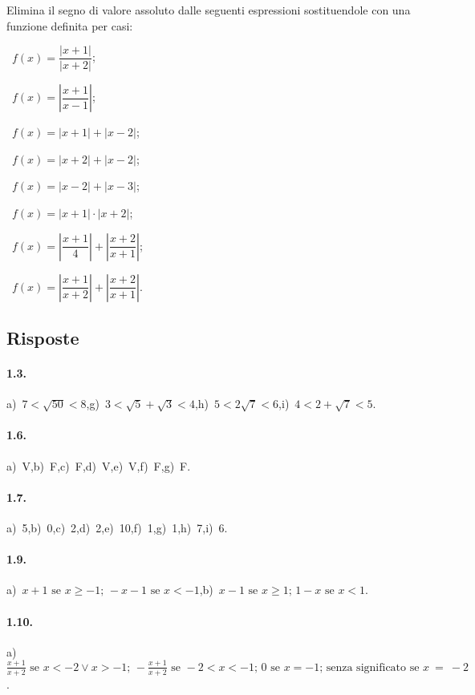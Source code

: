 \begin{esercizio}[\Ast]
\label{ese:1.10}
 Elimina il segno di valore assoluto dalle seguenti espressioni sostituendole con una funzione definita per casi:
 \begin{multicols}{2}
 \begin{enumeratea}
 \item~$f(x)=\dfrac{\left|x+1\right|}{\left|x+2\right|}$;
 \item~$f(x)=\left|\dfrac{x+1}{x-1}\right|$;
 \item~$f(x)=\left|x+1\right|+\left|x-2\right|$;
 \item~$f(x)=\left|x+2\right|+\left|x-2\right|$;
 \item~$f(x)=\left|x-2\right|+\left|x-3\right|$;
 \item~$f(x)=\left|x+1\right|\cdot \left|x+2\right|$;
 \item~$f(x)=\left|\dfrac{x+1} 4\right|+\left|\dfrac{x+2}{x+1}\right|$;
 \item~$f(x)=\left|\dfrac{x+1}{x+2}\right|+\left|\dfrac{x+2}{x+1}\right|$.
 \end{enumeratea}
 \end{multicols}
\end{esercizio}

\subsection{Risposte}

\paragraph{1.3.}
a)~$7<\sqrt{50}<8$,\quad g)~$3<\sqrt{5}+\sqrt{3}<4$,\quad h)~$5<2\sqrt{7}<6$,\quad i)~$4<2+\sqrt{7}<5$.

\paragraph{1.6.}
a)~V,\quad b)~F,\quad c)~F,\quad d)~V,\quad e)~V,\quad f)~F,\quad g)~F.

\paragraph{1.7.}
a)~5,\quad b)~0,\quad c)~2,\quad d)~2,\quad e)~10,\quad f)~1,\quad g)~1,\quad h)~7,\quad i)~6.

\paragraph{1.9.}
a)~${x+1}\text{ se }x\ge-1\text{; }-x-1\text{ se }x<-1$,\quad b)~${x-1}\text{ se }x\ge 1\text{; }1-x\text{ se }x<1$.

\paragraph{1.10.}
a)~$\frac{x+1}{x+2}\text{ se }x<-2 \vee x>-1\text{; }-\frac{x+1}{x+2}\text{ se }-2<x<-1\text{; }0\text{ se }x=-1\text{; senza significato se }x~=~-2$.
